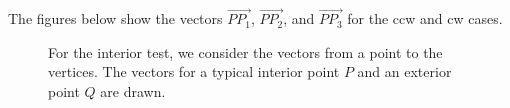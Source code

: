 \documentclass[a4paper]{article}
\begin{document}
The figures below show the vectors $\overrightarrow{PP_1}$, $\overrightarrow{PP_2}$, and $\overrightarrow{PP_3}$ for the ccw and cw cases.

\begin{figure}[H]
    \centering
    \qquad \qquad
    \caption{For the interior test, we consider the vectors from a point to the vertices. The vectors for a typical interior point  $P$ and an exterior point $Q$ are drawn.}
    \label{fig:triangle_int_ext}
\end{figure}
\end{document}
